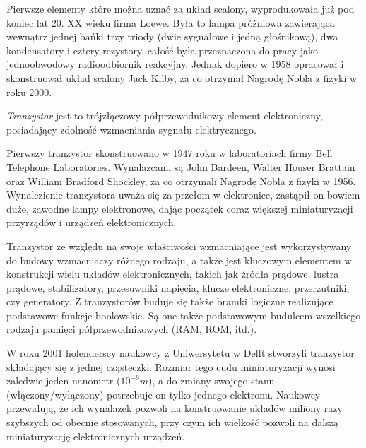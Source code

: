 \documentclass[a4paper,11pt]{article}
\begin{document}
Pierwsze elementy które można uznać za układ scalony, wyprodukowała już pod koniec lat 20. XX wieku firma Loewe. Była to lampa próżniowa zawierająca wewnątrz jednej bańki trzy triody (dwie sygnałowe i jedną głośnikową), dwa kondensatory i cztery rezystory, całość była przeznaczona do pracy jako jednoobwodowy radioodbiornik reakcyjny. Jednak dopiero w 1958 opracował i skonstruował układ scalony Jack Kilby, za co otrzymał Nagrodę Nobla z fizyki w roku 2000.

\textit{Tranzystor} jest to trójzłączowy półprzewodnikowy element elektroniczny, posiadający zdolność wzmacniania sygnału elektrycznego. 

 Pierwszy tranzystor skonstruowano w 1947 roku w laboratoriach firmy Bell Telephone Laboratories. Wynalazcami są John Bardeen, Walter Houser Brattain oraz William Bradford Shockley, za co otrzymali Nagrodę Nobla z fizyki w 1956. Wynalezienie tranzystora uważa się za przełom w elektronice, zastąpił on bowiem duże, zawodne lampy elektronowe, dając początek coraz większej miniaturyzacji przyrządów i urządzeń elektronicznych. 

Tranzystor ze względu na swoje właściwości wzmacniające jest  wykorzystywany do budowy wzmacniaczy różnego rodzaju, a także jest kluczowym elementem w konstrukcji wielu układów elektronicznych, takich jak źródła prądowe, lustra prądowe, stabilizatory, przesuwniki napięcia, klucze elektroniczne, przerzutniki, czy generatory. Z tranzystorów buduje się także bramki logiczne realizujące podstawowe funkcje boolowskie. Są one także podstawowym budulcem wszelkiego rodzaju pamięci półprzewodnikowych (RAM, ROM, itd.).

 W roku 2001 holenderscy naukowcy z Uniwersytetu w Delft stworzyli tranzystor składający się z jednej cząsteczki. Rozmiar tego cudu miniaturyzacji wynosi zaledwie jeden nanometr ($10^{-9}m$), a do zmiany swojego stanu (włączony/wyłączony) potrzebuje on tylko jednego elektronu. Naukowcy przewidują, że ich wynalazek pozwoli na konstruowanie układów miliony razy szybszych od obecnie stosowanych, przy czym ich wielkość pozwoli na dalszą miniaturyzację elektronicznych urządzeń. 
\end{document}
